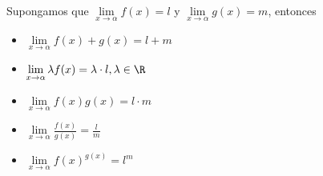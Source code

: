 \vspace{0.2cm}
\begin{proposition}
	Supongamos que \(\lim\limits_{x  \to \alpha} f(x) = l \) y \(\lim\limits_{x  \to \alpha} g(x) = m \), entonces
	\begin{itemize}
		\item \(\lim\limits_{x  \to \alpha} f(x) + g(x) = l + m \)
		\item \(\lim\limits_{x \to \alpha} \lambda f(x) = \lambda \cdot l, \lambda \in \R \)
		\item \(\lim\limits_{x  \to \alpha} f(x) g(x) = l \cdot m \)
		\item \(\lim\limits_{x  \to \alpha} \frac{f(x )}{g(x )} = \frac{l }{m }\)
		\item \(\lim\limits_{x  \to \alpha} f(x)^{g(x)} = l^{m} \)
	\end{itemize}
\end{proposition}
